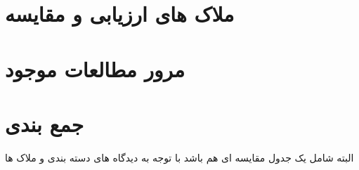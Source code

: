\section{ملاک های ارزیابی و مقایسه}

\section{مرور مطالعات موجود}

\section{جمع بندی}

 البته شامل یک جدول مقایسه ای هم باشد با توجه به دیدگاه های دسته بندی و ملاک ها